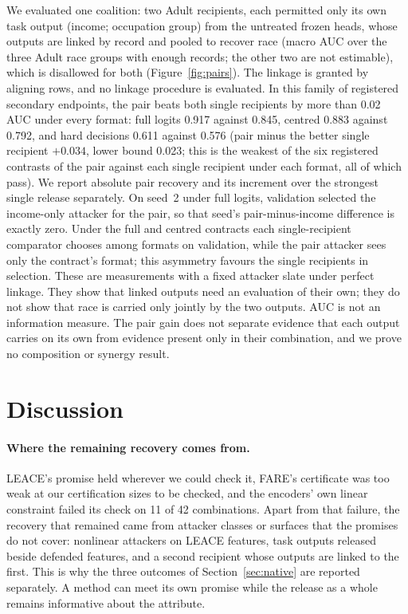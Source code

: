 \documentclass[10pt]{article}
\begin{document}
We evaluated one coalition: two Adult recipients, each permitted only its own task output (income; occupation group)
from the untreated frozen heads, whose outputs are linked by record and pooled to recover race (macro AUC over the three Adult race
groups with enough records; the other two are not estimable), which is disallowed for both (Figure~\ref{fig:pairs}). The linkage is granted by aligning rows, and no linkage procedure is evaluated. In this family of
registered secondary endpoints, the pair beats both single recipients by more than 0.02 AUC under every format: full logits 0.917 against 0.845, centred 0.883 against 0.792, and
hard decisions 0.611 against 0.576 (pair minus the better single recipient $+0.034$, lower bound 0.023; this is the weakest of the six registered
contrasts of the pair against each single recipient under each format, all of which pass). We
report absolute pair recovery and its increment over the strongest single release separately. On seed~2 under full
logits, validation selected the income-only attacker for the pair, so that seed's pair-minus-income difference is exactly zero. Under the full and centred contracts each single-recipient comparator chooses among formats on validation, while the
pair attacker sees only the contract's format; this asymmetry favours the single recipients in selection. These
are measurements with a fixed attacker slate under perfect linkage. They show that linked outputs
need an evaluation of their own; they do not show that race is carried only jointly by the two outputs. AUC is not an information measure. The pair gain does not separate evidence that each output carries on its own from
evidence present only in their combination, and we prove no composition or synergy result.

\section{Discussion}\label{sec:discussion}

\paragraph{Where the remaining recovery comes from.} LEACE's promise held wherever we could check it, FARE's
certificate was too weak at our certification sizes to be checked, and the encoders' own linear constraint failed its
check on 11 of 42 combinations. Apart from that failure, the recovery that remained came from attacker classes or
surfaces that the promises do not cover: nonlinear attackers on LEACE features, task outputs released beside defended
features, and a second recipient whose outputs are linked to the first. This is why the three outcomes of
Section~\ref{sec:native} are reported separately. A method can meet its own promise while the release as a whole
remains informative about the attribute.
\end{document}
